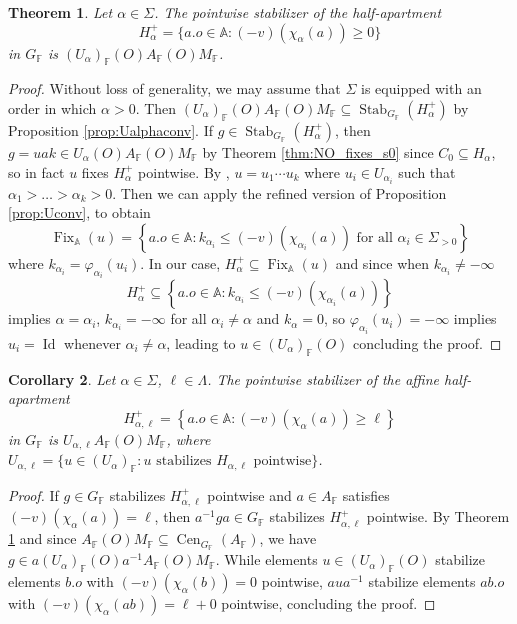 \documentclass[12pt]{amsart}
\newcommand{\F}{\mathbb{F} }
\newcommand{\A}{\mathbb{A}}
\numberwithin{equation}{section}
\newtheorem{theorem}{Theorem}[section]
\newtheorem{corollary}[theorem]{Corollary}
\theoremstyle{remark} %
\begin{document}
\begin{theorem}\label{thm:NalphaO_fixes_H}
	Let $\alpha \in \Sigma$. The pointwise stabilizer of the half-apartment
	$$
	H_\alpha^+ = \{ a.o \in \A \colon (-v)(\chi_\alpha(a)) \geq 0\}
	$$ 
	in $G_\F$ is $(U_\alpha)_\F(O) A_\F(O) M_\F$.
\end{theorem}
\begin{proof}
	Without loss of generality, we may assume that $\Sigma$ is equipped with an order in which $\alpha>0$. Then $(U_\alpha)_\F(O) A_\F(O) M_\F \subseteq \operatorname{Stab}_{G_\F}(H_\alpha^+)$ by Proposition \ref{prop:Ualphaconv}. If $g \in \operatorname{Stab}_{G_\F}(H_\alpha^+)$, then $g = uak \in U_\alpha(O) A_\F(O) M_\F$ by Theorem \ref{thm:NO_fixes_s0} since $C_0 \subseteq H_\alpha$, so in fact $u$ fixes $H_\alpha^+$ pointwise. By \cite[Lemma \ref{I-lem:BCH_consequence}]{AppAGRCF}, $u = u_1\cdots u_k$ where $u_i \in U_{\alpha_i}$ such that $\alpha_1 > \ldots > \alpha_k > 0$. Then we can apply the refined version of Proposition \ref{prop:Uconv}, to obtain 
	$$
	\operatorname{Fix}_\A(u) = \left\{ a.o \in \A \colon k_{\alpha_i} \leq (-v)(\chi_{\alpha_i}(a)) \text{ for all } \alpha_i \in \Sigma_{>0} \right\} 
	$$
	where $k_{\alpha_i} = \varphi_{\alpha_i}(u_i)$. In our case, $H_\alpha^+ \subseteq \operatorname{Fix}_\A(u)$ and since when $k_{\alpha_i} \neq -\infty$
	$$
	H_{\alpha}^+ \subseteq \left\{ a.o \in \A \colon k_{\alpha_i} \leq (-v)(\chi_{\alpha_i}(a)) \right\}
	$$ 
	implies $\alpha = \alpha_i$, %
	$k_{\alpha_i} = -\infty$ for all $\alpha_i \neq \alpha$ and $k_\alpha = 0$, so $\varphi_{\alpha_i}(u_i) = -\infty$ implies $u_i = \operatorname{Id}$ whenever $\alpha_i \neq \alpha$, leading to $u \in (U_\alpha)_\F(O)$ concluding the proof.
\end{proof}

\begin{corollary}\label{cor:NalphaO_fixes_H_affine}
	Let $\alpha \in \Sigma$, $\ell \in \Lambda$. The pointwise stabilizer of the affine half-apartment
	$$
	H_{\alpha,\ell}^+ = \left\{ a.o \in \A \colon (-v)(\chi_\alpha(a) ) \geq \ell  \right\}
	$$
	in $G_\F$ is $U_{\alpha, \ell} A_\F(O) M_\F$, where $U_{\alpha, \ell} =  \{ u \in (U_\alpha)_\F \colon u \text{ stabilizes } H_{\alpha, \ell} \text{ pointwise} \}$.
\end{corollary}
\begin{proof}
	If $g\in G_\F$ stabilizes $H_{\alpha,\ell}^+$ pointwise and $a\in A_\F$ satisfies $(-v)(\chi_\alpha(a)) = \ell$, then $a^{-1} g a \in G_\F$ stabilizes $H_{\alpha, \ell}^+$ pointwise. By Theorem \ref{thm:NalphaO_fixes_H} and since $A_\F(O) M_\F \subseteq \operatorname{Cen}_{G_\F}(A_\F)$, we have $g \in a(U_\alpha)_\F(O) a^{-1} A_\F(O) M_\F$. While elements $u \in (U_\alpha)_\F(O)$ stabilize elements $b.o$ with $(-v)(\chi_\alpha(b)) = 0$ pointwise, $a ua^{-1}$ stabilize elements $ab.o$ with $(-v)(\chi_\alpha(ab)) = \ell + 0 $ pointwise, concluding the proof.
\end{proof}
\end{document}
